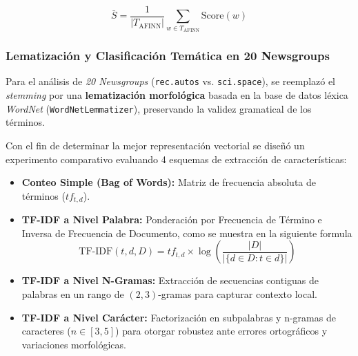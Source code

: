 \documentclass[12pt]{article}
\begin{document}
$$\bar{S} = \frac{1}{|T_{\text{AFINN}}|} \sum_{w \in T_{\text{AFINN}}} \text{Score}(w)$$

\subsubsection{Lematización y Clasificación Temática en 20 Newsgroups}
Para el análisis de \textit{20 Newsgroups} (\texttt{rec.autos} vs. \texttt{sci.space}), se reemplazó el \textit{stemming} por una \textbf{lematización morfológica} basada en la base de datos léxica \textit{WordNet} (\texttt{WordNetLemmatizer}), preservando la validez gramatical de los términos.

\begin{table}[H]
\caption{Distribución de Clases (Autos vs Espacio)}
\end{table}

Con el fin de determinar la mejor representación vectorial se diseñó un experimento comparativo evaluando 4 esquemas de extracción de características:
\begin{itemize}
    \item \textbf{Conteo Simple (Bag of Words):} Matriz de frecuencia absoluta de términos ($tf_{t,d}$).
    \item \textbf{TF-IDF a Nivel Palabra:} Ponderación por Frecuencia de Término e Inversa de Frecuencia de Documento, como se muestra en la siguiente formula
    $$\text{TF-IDF}(t, d, D) = tf_{t,d} \times \log \left( \frac{|D|}{|\{d \in D : t \in d\}|} \right)$$
    \item \textbf{TF-IDF a Nivel N-Gramas:} Extracción de secuencias contiguas de palabras en un rango de $(2, 3)$-gramas para capturar contexto local.
    \item \textbf{TF-IDF a Nivel Carácter:} Factorización en subpalabras y n-gramas de caracteres ($n \in [3, 5]$) para otorgar robustez ante errores ortográficos y variaciones morfológicas.
\end{itemize}
\end{document}
